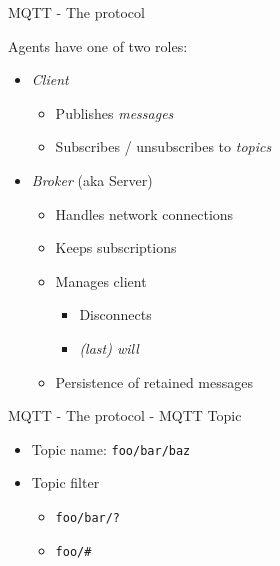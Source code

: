 \begin{frame}{MQTT - The protocol}
\protect\hypertarget{mqtt---the-protocol}{}

Agents have one of two roles:

\begin{itemize}
\tightlist
\item
  \emph{Client}

  \begin{itemize}
  \tightlist
  \item
    Publishes \emph{messages}
  \item
    Subscribes / unsubscribes to \emph{topics}
  \end{itemize}
\item
  \emph{Broker} (aka Server)

  \begin{itemize}
  \tightlist
  \item
    Handles network connections
  \item
    Keeps subscriptions
  \item
    Manages client

    \begin{itemize}
    \tightlist
    \item
      Disconnects
    \item
      \emph{(last) will}
    \end{itemize}
  \item
    Persistence of retained messages
  \end{itemize}
\end{itemize}


\end{frame}

\begin{frame}[fragile]{MQTT - The protocol - MQTT Topic}
\protect\hypertarget{mqtt---the-protocol---mqtt-topic}{}

\begin{itemize}
\tightlist
\item
  Topic name: \texttt{foo/bar/baz}
\item
  Topic filter

  \begin{itemize}
  \tightlist
  \item
    \texttt{foo/bar/?}
  \item
    \texttt{foo/\#}
  \end{itemize}
\end{itemize}

\end{frame}

